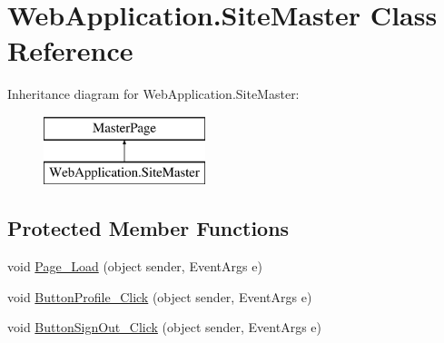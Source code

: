 \hypertarget{classWebApplication_1_1SiteMaster}{}\section{Web\+Application.\+Site\+Master Class Reference}
\label{classWebApplication_1_1SiteMaster}
Inheritance diagram for Web\+Application.\+Site\+Master\+:\begin{figure}[H]
\begin{center}
\leavevmode
\includegraphics[height=2.000000cm]{d8/d64/classWebApplication_1_1SiteMaster}
\end{center}
\end{figure}
\subsection*{Protected Member Functions}
\begin{DoxyCompactItemize}
\item 
void \mbox{\hyperlink{classWebApplication_1_1SiteMaster_af0e97c0a323fbba69b667fd6a11a9c53}{Page\+\_\+\+Load}} (object sender, Event\+Args e)
\item 
void \mbox{\hyperlink{classWebApplication_1_1SiteMaster_ab90867bea59adb9502f18812b0e2f531}{Button\+Profile\+\_\+\+Click}} (object sender, Event\+Args e)
\item 
void \mbox{\hyperlink{classWebApplication_1_1SiteMaster_ac4ef9b7a8418e64628e7301d7e2f4ac5}{Button\+Sign\+Out\+\_\+\+Click}} (object sender, Event\+Args e)
\end{DoxyCompactItemize}
